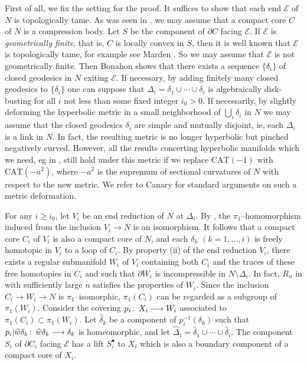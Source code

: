 \documentclass{gtart_a}
\theoremstyle{definition}
\numberwithin{equation}{section}
\begin{document}
First of all, we fix the setting for the proof.
It suffices to show that each end $\mathcal{E}$ of $N$ is topologically tame.
As was seen in , we may assume that a compact core $C$ of $N$ is a compression body.
Let $S$ be the component of $\partial C$ facing $\mathcal{E}$.
If $\mathcal{E}$ is \emph{geometrically finite\/}, that is, $C$ is locally convex in $S$, then it is well known 
that $\mathcal{E}$ is topologically tame, for example see Marden \cite{ma}.
So we may assume that $\mathcal{E}$ is not geometrically finite.
Then Bonahon \cite{bo} shows that there exists a sequence $\{\delta_i\}$ of closed geodesics in $N$ exiting 
$\mathcal{E}$.
If necessary, by adding finitely many closed geodesics to $\{\delta_i\}$ one can suppose that $\Delta_i=\delta_1
\cup \cdots\cup \delta_i$ is algebraically disk-busting for all $i$ not less than some fixed integer $i_0>0$.
If necessarily, by slightly deforming the hyperbolic metric in a small neighborhood of $\bigcup_i \delta_i$ in 
$N$ we may assume that the closed geodesics $\delta_i$ are simple and mutually disjoint, ie, each $\Delta_i$ 
is a link in $N$.
In fact, the resulting metric is no longer hyperbolic but pinched negatively curved.
However, all the results concerting hyperbolic manifolds which we need, eg  in 
, still hold under this metric if we replace $\mathrm{CAT}(-1)$ with $\mathrm{CAT}(-a^2)$, 
where $-a^2$ is the supremum of sectional curvatures of $N$ with respect to the new metric.
We refer to Canary \cite[Sections 4 and 5]{can} for standard arguments on such a metric deformation.


For any $i\geq i_0$, let $V_i$ be an end reduction of $N$ at $\Delta_i$.
By \cite{my}, the $\pi_1$--homomorphism induced from the inclusion $V_i\longrightarrow N$ is an isomorphism.
It follows that a compact core $C_i$ of $V_i$ is also a compact core of $N$, and each $\delta_k$ $(k=1,\ldots,i)$ 
is freely homotopic in $V_i$ to a loop of $C_i$.
By property (ii) of the end reduction $V_i$, there exists a regular submanifold $W_i$ of $V_i$ containing 
both $C_i$ and the traces of these free homotopies in $C_i$ and such that $\partial W_i$ is incompressible in 
$N\setminus \Delta_i$.
In fact, $R_n$ in  with sufficiently large $n$ satisfies the properties of $W_i$.
Since the inclusion $C_i\longrightarrow W_i\longrightarrow N$ is $\pi_1$--isomorphic, $\pi_1(C_i)$ can be regarded 
as a subgroup of $\pi_1(W_i)$.
Consider the covering $p_i\mskip0.5mu\colon\thinspace X_i\longrightarrow W_i$ associated to $\pi_1(C_i)\subset \pi_1(W_i)$.
Let $\hat\delta_k$ be a component of $p^{-1}_i(\delta_k)$ such that $p_i|\hat \delta_k\co \hat\delta_k\longrightarrow 
\delta_k$ is homeomorphic, and let $\hat \Delta_i=\hat\delta_1\cup\cdots\cup\hat\delta_i$.
The component $S_i$ of $\partial C_i$ facing $\mathcal{E}$ has a lift $S_i^\bullet$ to $X_i$ which is also a 
boundary component of a compact core of $X_i$.
\end{document}
